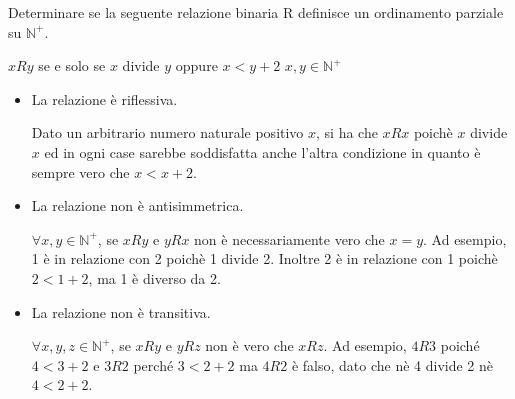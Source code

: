 



\begin{esercizio}
    Determinare se la seguente relazione binaria R definisce un ordinamento parziale su $\mathbb{N}^+$.
	
	\begin{center}
		$xRy$ se e solo se $x$ divide $y$ oppure $x < y + 2$ \qquad $x,y \in \mathbb{N}^+$
	\end{center}
\end{esercizio}

\begin{soluzione}

\begin{itemize}\setlength\itemsep{1em}
	\item La relazione è riflessiva. 
	
	Dato un arbitrario numero naturale positivo $x$, si ha che $xRx$ poichè $x$ divide $x$ ed in ogni case sarebbe soddisfatta anche l'altra condizione in quanto è sempre vero che $x<x+2$.
	
	
	\item La relazione non è antisimmetrica. 
	
	$\forall x,y \in \mathbb{N}^+ $, se $xRy$ e $yRx$ non è necessariamente vero che $x=y$. Ad esempio, 1 è in relazione con 2 poichè 1 divide 2. Inoltre 2 è in relazione con 1 poichè $2 < 1+2$, ma 1 è diverso da 2. 
	
	\item La relazione non è transitiva. 
	
	$\forall x,y,z \in \mathbb{N}^+$, se $xRy$ e $yRz$ non è vero che $xRz$. Ad esempio, $4R3$ poiché $4<3+2$ e $3R2$ perché $3<2+2$ ma $4R2$ è falso, dato che nè 4 divide 2 nè $4 < 2+2$.
\end{itemize}

\end{soluzione}



